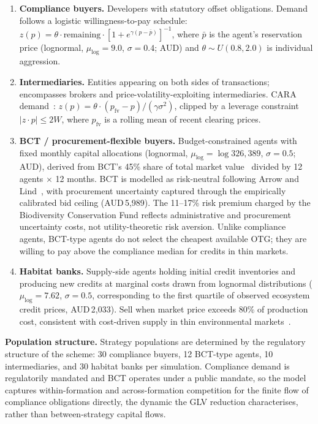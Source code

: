 \documentclass[pdflatex,sn-nature,oneside]{sn-jnl}
\begin{document}
\begin{enumerate}
  \item \textbf{Compliance buyers.} Developers with statutory offset obligations.
    Demand follows a logistic willingness-to-pay schedule:
    $z(p) = \theta \cdot \text{remaining} \cdot [1 + e^{\gamma(p - \bar{p})}]^{-1}$,
    where $\bar{p}$ is the agent's reservation price (lognormal, $\mu_{\log}=9.0$,
    $\sigma=0.4$; AUD)
    and $\theta \sim U(0.8, 2.0)$ is individual aggression.

  \item \textbf{Intermediaries.} Entities appearing on both sides
    of transactions; encompasses brokers and price-volatility-exploiting
    intermediaries.
    CARA demand~\cite{ChiarellaHe2002}:
    $z(p) = \theta \cdot (p_{\text{fv}} - p) / (\gamma \sigma^2)$,
    clipped by a leverage constraint $|z \cdot p| \leq 2W$,
    where $p_{\text{fv}}$ is a rolling mean of recent clearing prices.

  \item \textbf{BCT / procurement-flexible buyers.} Budget-constrained agents with
    fixed monthly capital allocations (lognormal, $\mu_{\log} = \log 326{,}389$,
    $\sigma = 0.5$; AUD), derived from BCT's 45\% share of total market
    value~\cite{IPART2025} divided by 12 agents $\times$ 12 months.
    BCT is modelled as risk-neutral following Arrow and
    Lind~\cite{ArrowLind1970}, with procurement uncertainty captured through the
    empirically calibrated bid ceiling (AUD\,5,989).
    The 11--17\% risk premium charged by the Biodiversity Conservation Fund reflects
    administrative and procurement uncertainty costs, not utility-theoretic risk
    aversion.
    Unlike compliance agents, BCT-type agents do not select the cheapest available
    OTG; they are willing to pay above the compliance median for credits in thin
    markets.

  \item \textbf{Habitat banks.} Supply-side agents holding initial credit inventories
    and producing new credits at marginal costs drawn from lognormal
    distributions ($\mu_{\log} = 7.62$, $\sigma = 0.5$,
    corresponding to the first quartile of observed ecosystem credit
    prices, AUD\,2,033).
    Sell when market price exceeds 80\% of production cost, consistent with
    cost-driven supply in thin environmental markets~\cite{Drechsler2022}.
\end{enumerate}

\textbf{Population structure.}
Strategy populations are determined by the regulatory structure of the
scheme: 30 compliance buyers, 12 BCT-type agents, 10 intermediaries, and
30 habitat banks per simulation. Compliance demand is regulatorily
mandated and BCT operates under a public mandate, so the model captures
within-formation and across-formation competition for the finite flow of
compliance obligations directly, the dynamic the GLV reduction
characterises, rather than between-strategy capital flows.
\end{document}
